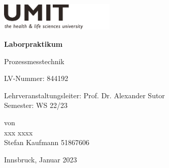 \documentclass[11pt,oneside,bibtotoc,liststotoc]{scrbook}
\begin{document}
\thispagestyle{empty}
\graphicspath{{images/}}
\kern-13.5mm\includegraphics[width=55mm]{image/Titel/logo_umit.pdf}
 


\vspace*{2cm}\par
\begin{center}

{\huge \textbf{ Laborpraktikum}} \\[1em]
\vspace{2cm}\par

{\large Prozessmesstechnik}
\vspace{1cm}\par
{\large LV-Nummer: 844192}
\vspace{1cm}\par
Lehrveranstaltungsleiter: Prof. Dr. Alexander Sutor \\
Semester: WS 22/23



von \\[1ex]
xxx xxxx \\
Stefan Kaufmann    51867606 
\vspace{1cm}\par

Innsbruck, Januar 2023

\end{center}



\thispagestyle{empty}

\setcounter{page}{1}
\renewcommand{\baselinestretch}{1.00}\normalsize
\tableofcontents
\listoffigures
\listoftables
\renewcommand{\baselinestretch}{1.5}\normalsize
\newpage
\setcounter{page}{1}

 
\newpage
\newpage
%
\newpage
%
\newpage
%









%
\clearpage

%
\end{document}
